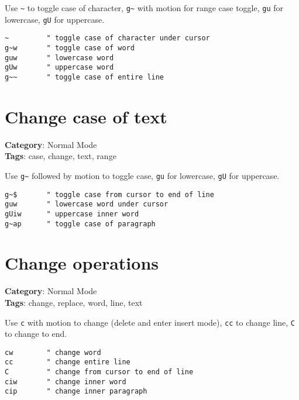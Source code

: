 {{{{{{{{{Use {\footnotesize \Verb§~§} to toggle case of character, {\footnotesize \Verb§g~§} with motion for range case toggle, {\footnotesize \Verb§gu§} for lowercase, {\footnotesize \Verb§gU§} for uppercase.

\begin{Exa*}{}
\begin{Verbatim}[fontsize=\footnotesize, breaklines, breakanywhere]
~         " toggle case of character under cursor
g~w       " toggle case of word
guw       " lowercase word
gUw       " uppercase word
g~~       " toggle case of entire line
\end{Verbatim}
\end{Exa*}

\section{Change case of text}

\textbf{Category}: Normal Mode\\ \textbf{Tags}: case, change, text, range
\vspace{0.5cm}

Use {\footnotesize \Verb§g~§} followed by motion to toggle case, {\footnotesize \Verb§gu§} for lowercase, {\footnotesize \Verb§gU§} for uppercase.

\begin{Exa*}{}
\begin{Verbatim}[fontsize=\footnotesize, breaklines, breakanywhere]
g~$       " toggle case from cursor to end of line
guw       " lowercase word under cursor
gUiw      " uppercase inner word
g~ap      " toggle case of paragraph
\end{Verbatim}
\end{Exa*}

\section{Change operations}

\textbf{Category}: Normal Mode\\ \textbf{Tags}: change, replace, word, line, text
\vspace{0.5cm}

Use {\footnotesize \Verb§c§} with motion to change (delete and enter insert mode), {\footnotesize \Verb§cc§} to change line, {\footnotesize \Verb§C§} to change to end.

\begin{Exa*}{}
\begin{Verbatim}[fontsize=\footnotesize, breaklines, breakanywhere]
cw        " change word
cc        " change entire line
C         " change from cursor to end of line
ciw       " change inner word
cip       " change inner paragraph
\end{Verbatim}
\end{Exa*}

}}}}}}}}}
